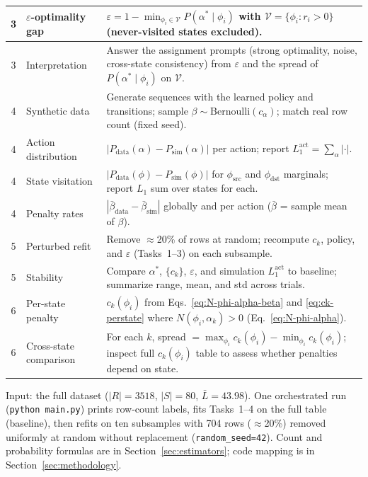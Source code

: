 \documentclass[11pt,a4paper]{article}
\begin{document}
\begin{table}[H]
\begin{tabularx}{\linewidth}{@{}c
      >{\raggedright\arraybackslash}p{2.55cm}
      >{\raggedright\arraybackslash}X@{}}
    \hline
    3 & $\varepsilon$-optimality gap &
    $\varepsilon=1-\min_{\phi_i\in\mathcal{V}} P(\alpha^\ast\mid\phi_i)$ with
    $\mathcal{V}=\{\phi_i : r_i>0\}$ (never-visited states excluded). \\
    \hline
    3 & Interpretation &
    Answer the assignment prompts (strong optimality, noise, cross-state consistency)
    from $\varepsilon$ and the spread of $P(\alpha^\ast\mid\phi_i)$ on $\mathcal{V}$. \\
    \hline
    4 & Synthetic data &
    Generate sequences with the learned policy and transitions; sample
    $\beta\sim\mathrm{Bernoulli}(c_\alpha)$; match real row count (fixed seed). \\
    \hline
    4 & Action distribution &
    $|P_{\mathrm{data}}(\alpha)-P_{\mathrm{sim}}(\alpha)|$ per action; report
    $L_1^{\mathrm{act}}=\sum_\alpha |\cdot|$. \\
    \hline
    4 & State visitation &
    $|P_{\mathrm{data}}(\phi)-P_{\mathrm{sim}}(\phi)|$ for $\phi_{\mathrm{src}}$ and
    $\phi_{\mathrm{dst}}$ marginals; report $L_1$ sum over states for each. \\
    \hline
    4 & Penalty rates &
    $|\bar\beta_{\mathrm{data}}-\bar\beta_{\mathrm{sim}}|$ globally and per action
    ($\bar\beta$ = sample mean of $\beta$). \\
    \hline
    5 & Perturbed refit &
    Remove $\approx$20\% of rows at random; recompute $c_k$, policy, and $\varepsilon$
    (Tasks~1--3) on each subsample. \\
    \hline
    5 & Stability &
    Compare $\alpha^\ast$, $\{c_k\}$, $\varepsilon$, and simulation $L_1^{\mathrm{act}}$
    to baseline; summarize range, mean, and std across trials. \\
    \hline
    6 & Per-state penalty &
    $c_k(\phi_i)$ from Eqs.~\eqref{eq:N-phi-alpha-beta} and \eqref{eq:ck-perstate}
    where $N(\phi_i,\alpha_k)>0$ (Eq.~\eqref{eq:N-phi-alpha}). \\
    \hline
    6 & Cross-state comparison &
    For each $k$, spread $=\max_{\phi_i} c_k(\phi_i)-\min_{\phi_i} c_k(\phi_i)$;
    inspect full $c_k(\phi_i)$ table to assess whether penalties depend on state. \\
    \hline
  \end{tabularx}
\end{table}

Input: the full dataset ($|R|=3518$, $|S|=80$, $\bar{L}=43.98$).
One orchestrated run (\texttt{python main.py}) prints row-count labels, fits Tasks~1--4
on the full table (baseline), then refits on ten subsamples with 704 rows
($\approx$20\%) removed uniformly at random without replacement
(\texttt{random\_seed=42}). Count and probability formulas are in
Section~\ref{sec:estimators}; code mapping is in Section~\ref{sec:methodology}.
\end{document}
